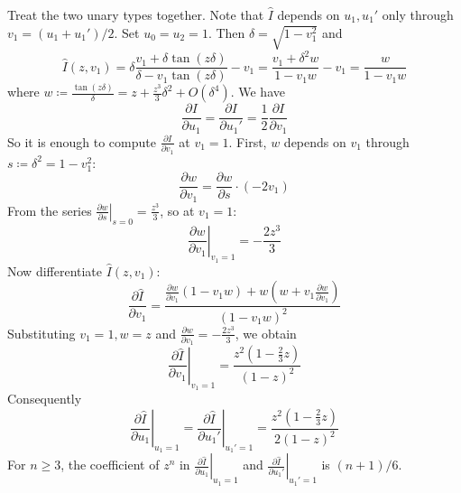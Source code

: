 Treat the two unary types together. Note that $\hat{I}$ depends on $u_{1}, u_{1}'$ only through
$v_{1} = (u_{1} + u_{1}')/2$. Set $u_{0} = u_{2} = 1$. Then $\delta = \sqrt{1 - v_{1}^{2}}$ and
\begin{equation*}
    \hat{I}(z, v_{1}) = \delta \frac{v_{1} + \delta\tan(z\delta)}{\delta - v_{1}\tan(z\delta)} - v_{1}
        = \frac{v_{1} + \delta^{2}w}{1 - v_{1}w} - v_{1} = \frac{w}{1 - v_{1}w}
\end{equation*}
where $w \coloneqq \frac{\tan(z\delta)}{\delta} = z + \frac{z^{3}}{3}\delta^{2} + O(\delta^{4})$.
We have
\begin{equation*}
    \frac{\partial I}{\partial u_{1}} = \frac{\partial I}{\partial u_{1}'} = \frac{1}{2} \frac{\partial I}{\partial v_{1}}
\end{equation*}
So it is enough to compute $\frac{\partial I}{\partial v_{1}}$ at $v_{1} = 1$. First, $w$ depends on $v_{1}$ through $s \coloneqq \delta^{2} = 1 - v_{1}^{2}$:
\begin{equation*}
    \frac{\partial w}{\partial v_{1}} = \frac{\partial w}{\partial s} \cdot (-2v_{1})
\end{equation*}
From the series $\left.\frac{\partial w}{\partial s} \right|_{s = 0} = \frac{z^{3}}{3}$, so at $v_{1} = 1$:
\begin{equation*}
    \left.\frac{\partial w}{\partial v_{1}}\right|_{v_{1} = 1} = -\frac{2z^{3}}{3}
\end{equation*}
Now differentiate $\hat{I}(z, v_{1})$:
\begin{equation*}
    \frac{\partial \hat{I}}{\partial v_{1}}
        = \frac{\frac{\partial w}{\partial v_{1}}(1 - v_{1}w) + w(w + v_{1} \frac{\partial w}{\partial v_{1}})}{(1 - v_{1}w)^{2}}
\end{equation*}
Substituting $v_{1} = 1, w = z$ and $\frac{\partial w}{\partial v_{1}} = -\frac{2z^{3}}{3}$, we obtain
\begin{equation*}
    \left.\frac{\partial \hat{I}}{\partial v_{1}}\right|_{v_{1} = 1} = \frac{z^{2}\left(1 - \frac{2}{3} z\right)}{(1 - z)^{2}}
\end{equation*}
Consequently
\begin{equation*}
    \left.\frac{\partial \hat{I}}{\partial u_{1}}\right|_{u_{1} = 1} = \left.\frac{\partial \hat{I}}{\partial u_{1}'}\right|_{u_{1}' = 1}
        = \frac{z^{2}\left(1 - \frac{2}{3} z\right)}{2(1 - z)^{2}}
\end{equation*}
For $n \geq 3$, the coefficient of $z^{n}$ in
$\left.\frac{\partial \hat{I}}{\partial u_{1}}\right|_{u_{1} = 1}$ and
$\left.\frac{\partial \hat{I}}{\partial u_{1}'}\right|_{u_{1}' = 1}$ is $(n + 1)/6$.

